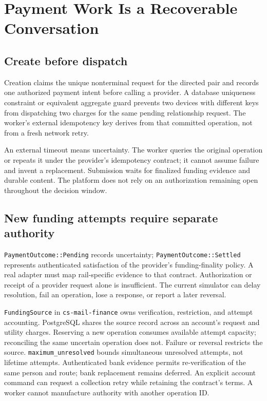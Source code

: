 \documentclass[11pt]{article}
\begin{document}
\section{Payment Work Is a Recoverable Conversation}

\subsection{Create before dispatch}

Creation claims the unique nonterminal request for the directed pair and records
one authorized payment intent before calling a provider. A database uniqueness
constraint or equivalent aggregate guard prevents two devices with different
keys from dispatching two charges for the same pending relationship request.
The worker's external idempotency key derives from that committed operation,
not from a fresh network retry.

An external timeout means uncertainty. The worker queries the original operation
or repeats it under the provider's idempotency contract; it cannot assume failure
and invent a replacement. Submission waits for finalized funding evidence and durable content. The platform does not rely on an authorization
remaining open throughout the decision window.

\subsection{New funding attempts require separate authority}

\texttt{PaymentOutcome::Pending} records uncertainty;
\texttt{PaymentOutcome::Settled} represents authenticated satisfaction of the
provider's funding-finality policy. A real adapter must map rail-specific evidence
to that contract. Authorization or receipt of a provider request alone is
insufficient. The current simulator can delay resolution, fail an operation,
lose a response, or report a later reversal.

\texttt{FundingSource} in \texttt{cs-mail-finance} owns verification, restriction,
and attempt accounting. PostgreSQL shares the source record across an account's
request and utility charges. Reserving a new operation consumes available attempt
capacity; reconciling the same uncertain operation does not. Failure or reversal
restricts the source. \texttt{maximum\_unresolved} bounds simultaneous unresolved
attempts, not lifetime attempts. Authenticated bank evidence permits
re-verification of the same person and route; bank replacement remains deferred.
An explicit account command can request a collection retry while retaining the
contract's terms. A worker cannot manufacture authority with another operation ID.
\end{document}
